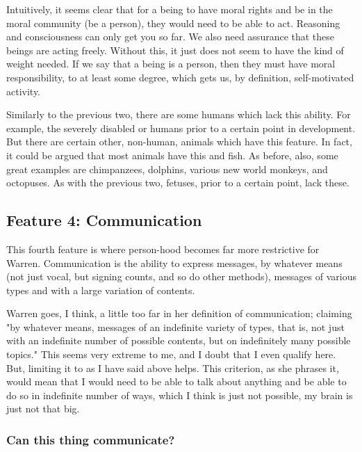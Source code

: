 Intuitively, it seems clear that for a being to have moral rights and be in the moral community (be a person), they would need to be able to act. Reasoning and consciousness can only get you so far. We also need assurance that these beings are acting freely. Without this, it just does not seem to have the kind of weight needed. If we say that a being is a person, then they must have moral responsibility, to at least some degree, which gets us, by definition, self-motivated activity.  

Similarly to the previous two, there are some humans which lack this ability. For example, the severely disabled or humans prior to a certain point in development. But there are certain other, non-human, animals which have this feature. In fact, it could be argued that most animals have this and fish. As before, also, some great examples are chimpanzees, dolphins, various new world monkeys, and octopuses. As with the previous two, fetuses, prior to a certain point, lack these. 

\subsection{Feature 4: Communication}

This fourth feature is where person-hood becomes far more restrictive for Warren. Communication is the ability to express messages, by whatever means (not just vocal, but signing counts, and so do other methods), messages of various types and with a large variation of contents. 

Warren goes, I think, a little too far in her definition of communication; claiming "by whatever means, messages of an indefinite variety of types, that is, not just with an indefinite number of possible contents, but on indefinitely many possible topics." This seems very extreme to me, and I doubt that I even qualify here. But, limiting it to as I have said above helps. This criterion, as she phrases it, would mean that I would need to be able to talk about anything and  be able to do so in indefinite number of ways, which I think is just not possible, my brain is just not that big.
\subsubsection{Can this thing communicate?}

